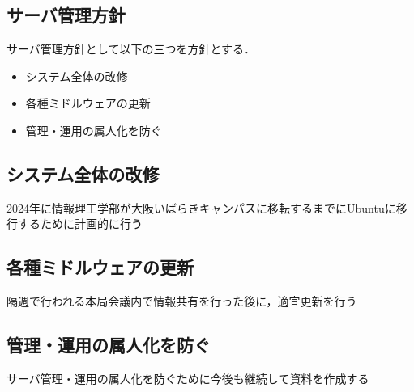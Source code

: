 \subsection*{サーバ管理方針}


サーバ管理方針として以下の三つを方針とする．
\begin{itemize}
    \item システム全体の改修
    \item 各種ミドルウェアの更新
    \item 管理・運用の属人化を防ぐ
\end{itemize}

\subsection*{システム全体の改修}
2024年に情報理工学部が大阪いばらきキャンパスに移転するまでにUbuntuに移行するために計画的に行う

\subsection*{各種ミドルウェアの更新}
隔週で行われる本局会議内で情報共有を行った後に，適宜更新を行う

\subsection*{管理・運用の属人化を防ぐ}
サーバ管理・運用の属人化を防ぐために今後も継続して資料を作成する
